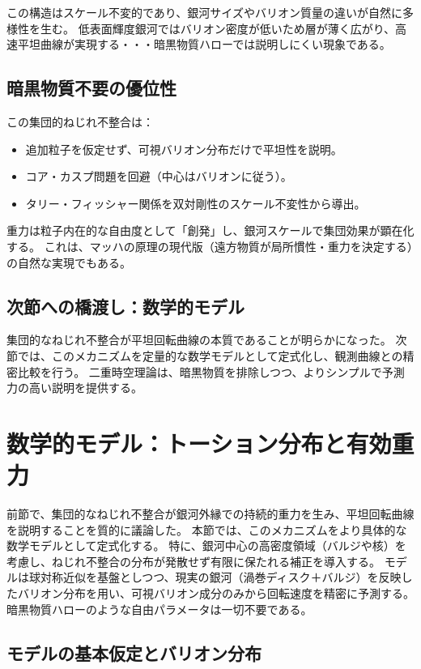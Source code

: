 \documentclass[dvipdfmx,a4paper]{jsbook}
\theoremstyle{definition}
\theoremstyle{remark}
\begin{document}
この構造はスケール不変的であり、銀河サイズやバリオン質量の違いが自然に多様性を生む。  
低表面輝度銀河ではバリオン密度が低いため層が薄く広がり、高速平坦曲線が実現する・・・暗黒物質ハローでは説明しにくい現象である。

\subsection{暗黒物質不要の優位性}

この集団的ねじれ不整合は：
\begin{itemize}
  \item 追加粒子を仮定せず、可視バリオン分布だけで平坦性を説明。
  \item コア・カスプ問題を回避（中心はバリオンに従う）。
  \item タリー・フィッシャー関係を双対剛性のスケール不変性から導出。
\end{itemize}

重力は粒子内在的な自由度として「創発」し、銀河スケールで集団効果が顕在化する。  
これは、マッハの原理の現代版（遠方物質が局所慣性・重力を決定する）の自然な実現でもある。

\subsection{次節への橋渡し：数学的モデル}

集団的なねじれ不整合が平坦回転曲線の本質であることが明らかになった。  
次節では、このメカニズムを定量的な数学モデルとして定式化し、観測曲線との精密比較を行う。  
二重時空理論は、暗黒物質を排除しつつ、よりシンプルで予測力の高い説明を提供する。

\section{数学的モデル：トーション分布と有効重力}
\label{sec:mathematical-model}

前節で、集団的なねじれ不整合が銀河外縁での持続的重力を生み、平坦回転曲線を説明することを質的に議論した。  
本節では、このメカニズムをより具体的な数学モデルとして定式化する。  
特に、銀河中心の高密度領域（バルジや核）を考慮し、ねじれ不整合の分布が発散せず有限に保たれる補正を導入する。  
モデルは球対称近似を基盤としつつ、現実の銀河（渦巻ディスク＋バルジ）を反映したバリオン分布を用い、可視バリオン成分のみから回転速度を精密に予測する。  
暗黒物質ハローのような自由パラメータは一切不要である。

\subsection{モデルの基本仮定とバリオン分布}
\end{document}
